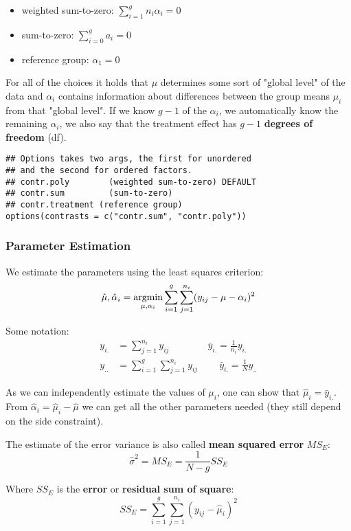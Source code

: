\begin{itemize}
	\item weighted sum-to-zero: $\sum_{i=1}^{g} n_i \alpha_i = 0$
	\item sum-to-zero: $\sum_{i=0}^g a_i = 0$
	\item reference group: $\alpha_1 = 0$
\end{itemize}

For all of the choices it holds that $\mu$ determines some sort of "global level" of the data and $\alpha_i$ contains information about differences between the group means $\mu_i$ from that "global level". If we know $g-1$ of the $\alpha_i$, we automatically know the remaining $\alpha_i$, we also say that the treatment effect has $g-1$ \textbf{degrees of freedom} (df).

\begin{lstlisting}
## Options takes two args, the first for unordered 
## and the second for ordered factors.
## contr.poly        (weighted sum-to-zero) DEFAULT
## contr.sum         (sum-to-zero)
## contr.treatment (reference group)
options(contrasts = c("contr.sum", "contr.poly"))
\end{lstlisting}

\subsubsection{Parameter Estimation}

We estimate the parameters using the least squares criterion:
$$\hat \mu, \hat \alpha_i = \underset{\mu, \alpha_i}{\text{argmin}} \sum_{i=1}^g \sum_{j=1}^{n_i}(y_{ij} - \mu - \alpha_i)^2$$

Some notation:
\begin{align*}
	y_{i.} &= \sum_{j=1}^{n_i}y_{ij} 			  \qquad \qquad  \bar y_{i.} = \frac{1}{n_i}y_{i.}\\
	y_{..} &= \sum_{i=1}^g \sum_{j=1}^{n_i}y_{ij} \qquad \ \bar y_{i.} = \frac{1}{N} y_{..}
\end{align*}

As we can independently estimate the values of $\mu_i$, one can show that $\hat \mu_i = \bar y_{i.}$. From $\hat \alpha_i = \hat \mu_i - \hat \mu$ we can get all the other parameters needed (they still depend on the side constraint). \medskip

The estimate of the error variance is also called \textbf{mean squared error} $MS_E$:
$$\hat \sigma^2 = MS_E = \frac{1}{N - g} SS_E$$

Where $SS_E$ is the \textbf{error} or \textbf{residual sum of square}:
$$SS_E = \sum_{i=1}^g \sum_{j=1}^{n_i}(y_{ij} - \hat \mu_i)^2$$

